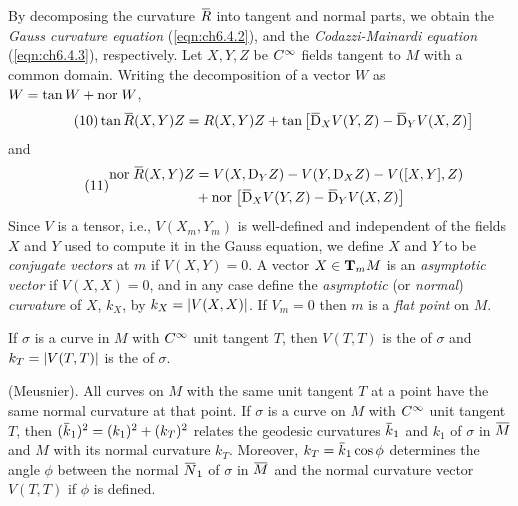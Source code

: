 \documentclass[../main]{subfiles}
\begin{document}
By decomposing the curvature $\xoverline R$ into tangent and normal parts, we obtain the \emph{Gauss curvature equation} (\ref{eqn:ch6.4.2}), and the \emph{Codazzi-Mainardi equation} (\ref{eqn:ch6.4.3}), respectively. Let $X,Y,Z$ be $\CInfty$ fields tangent to $M$ with a common domain. Writing the decomposition of a vector $W$ as $W=\tan W+\nor W$,
\begin{equation}\tag{10} \label{eqn:ch6.4.2}
    \tan\xoverline R(X,Y)Z = R(X,Y)Z+\tan\sbr{\covariant_XV(Y,Z)-\covariant_YV(X,Z)}
\end{equation}
and
\begin{equation}\tag{11}\label{eqn:ch6.4.3}
    \begin{split}
        \nor\xoverline R(X,Y)Z &= V(X,\D_YZ)-V(Y,\D_XZ)-V([X,Y],Z)\\
        &+\nor\big[\covariant_XV(Y,Z)-\covariant_YV(X,Z)\big]
    \end{split}
\end{equation}
Since $V$ is a tensor, i.e., $V(X_m,Y_m)$ is well-defined and independent of the fields $X$ and $Y$ used to compute it in the Gauss equation, we define $X$ and $Y$ to be \emph{conjugate vectors} at $m$ if $V(X,Y)=0$. A vector $X\in\tangentspace{M}{m}$ is an \emph{asymptotic vector} if $V(X,X)=0$, and in any case define the \emph{asymptotic} (or \emph{normal}) \emph{curvature} of $X$, $k_X$, by $k_X=\norm{V(X,X)}$. If $V_m=0$ then $m$ is a \emph{flat point} on $M$.

If $\sigma$ is a curve in $M$ with $\CInfty$ unit tangent $T$, then $V(T,T)$ is the  of $\sigma$ and $k_T=\norm{V(T,T)}$ is the  of $\sigma$.



\begin{theorem} \label{thm:ch6.4.2}
(Meusnier). All curves on $M$ with the same unit tangent $T$ at a point have the same normal curvature at that point. If $\sigma$ is a curve on $M$ with $\CInfty$ unit tangent $T$, then $(\xoverline k_1)^2 = (k_1)^2+(k_T)^2$
relates the geodesic curvatures $\xoverline k_1$ and $k_1$ of $\sigma$ in $\xoverline M$ and $M$ with its normal curvature $k_T$. Moreover, \newline$k_T = \xoverline k_1\cos\phi$
determines the angle $\phi$ between the normal $\xoverline N_1$ of $\sigma$ in $\xoverline M$ and the normal curvature vector $V(T,T)$ if $\phi$ is defined.
\end{theorem}
\end{document}

